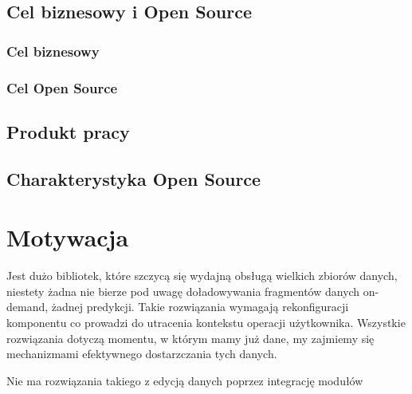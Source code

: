 \subsection{Cel biznesowy i Open Source}

\subsubsection*{Cel biznesowy}
\subsubsection*{Cel Open Source}

\subsection{Produkt pracy}

\subsection{Charakterystyka Open Source}


\section{Motywacja}

Jest dużo bibliotek, które szczycą się wydajną obsługą wielkich zbiorów danych, niestety żadna nie bierze pod uwagę doładowywania fragmentów danych on-demand, żadnej predykcji. Takie rozwiązania wymagają rekonfiguracji komponentu co prowadzi do utracenia kontekstu operacji użytkownika.
Wszystkie rozwiązania dotyczą momentu, w którym mamy już dane, 
my zajmiemy się mechanizmami efektywnego dostarzczania tych danych.

Nie ma rozwiązania takiego z edycją danych poprzez integrację modułów




